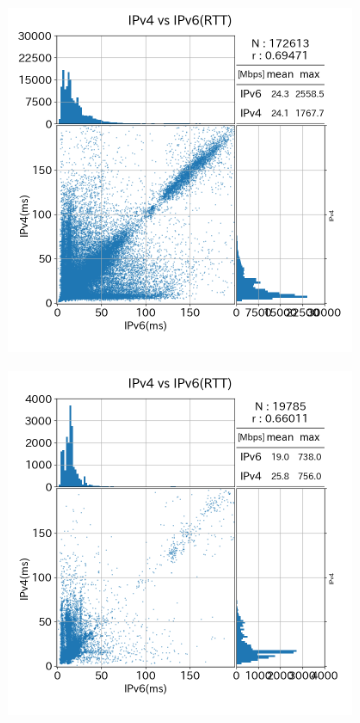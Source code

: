 \begin{figure}[htbp]
\begin{center}
\begin{subfigure}[b]{0.49\textwidth}
            \label{old_diffISP_rtt}
        \end{subfigure}
        \caption{(1)のRTT}
        \label{fig:old_isp_rtt}
    
        \begin{subfigure}[b]{0.49\textwidth}
            \centering
            \includegraphics[width=1.0\textwidth]{fig/new_sameISP_rtt.png}
            \label{new_sameISP_rtt}
        \end{subfigure}
        \begin{subfigure}[b]{0.49\textwidth}
            \centering
            \includegraphics[width=1.0\textwidth]{fig/new_diffISP_rtt.png}

\end{subfigure}
\end{center}
\end{figure}
